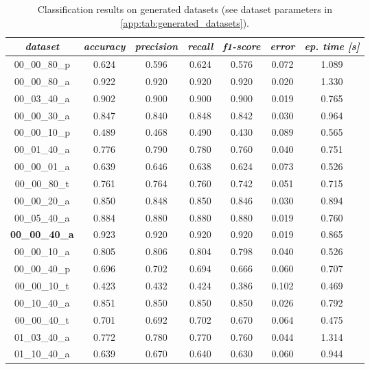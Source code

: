 \begin{table}[H]
\centering
\caption{Classification results on generated datasets (see dataset parameters in \cref{app:tab:generated_datasets}).}
\label{tab:classification_results}
\resizebox{\textwidth}{!} {
\begin{tabular}{|c|c|c|c|c|c|c|}
\hline
\textit{dataset} & \textit{accuracy} & \textit{precision} & \textit{recall} & \textit{f1-score} & \textit{error} & \textit{ep. time {[}s{]}} \\
\hline
00\_00\_80\_p 	& 0.624 	& 0.596 	& 0.624 	& 0.576 	& 0.072 	& 1.089 	 \\ \hline
00\_00\_80\_a 	& 0.922 	& 0.920 	& 0.920		& 0.920 	& 0.020 	& 1.330 	 \\ \hline
00\_03\_40\_a 	& 0.902 	& 0.900 	& 0.900 	& 0.900 	& 0.019 	& 0.765 	 \\ \hline
00\_00\_30\_a 	& 0.847 	& 0.840 	& 0.848 	& 0.842 	& 0.030 	& 0.964 	 \\ \hline
00\_00\_10\_p 	& 0.489 	& 0.468 	& 0.490 	& 0.430 	& 0.089 	& 0.565 	 \\ \hline
00\_01\_40\_a 	& 0.776 	& 0.790 	& 0.780 	& 0.760 	& 0.040 	& 0.751 	 \\ \hline
00\_00\_01\_a 	& 0.639 	& 0.646 	& 0.638 	& 0.624 	& 0.073 	& 0.526 	 \\ \hline
00\_00\_80\_t	& 0.761 	& 0.764 	& 0.760 	& 0.742 	& 0.051 	& 0.715 	 \\ \hline
00\_00\_20\_a 	& 0.850 	& 0.848 	& 0.850 	& 0.846 	& 0.030 	& 0.894 	 \\ \hline
00\_05\_40\_a 	& 0.884 	& 0.880 	& 0.880 	& 0.880 	& 0.019 	& 0.760 	 \\ \hline
\textbf{00\_00\_40\_a} 	& 0.923 	& 0.920 	& 0.920 	& 0.920 	& 0.019 	& 0.865 	 \\ \hline
00\_00\_10\_a 	& 0.805 	& 0.806 	& 0.804 	& 0.798 	& 0.040 	& 0.526 	 \\ \hline
00\_00\_40\_p 	& 0.696 	& 0.702 	& 0.694 	& 0.666 	& 0.060 	& 0.707 	 \\ \hline
00\_00\_10\_t 	& 0.423 	& 0.432 	& 0.424 	& 0.386 	& 0.102 	& 0.469 	 \\ \hline
00\_10\_40\_a 	& 0.851 	& 0.850 	& 0.850 	& 0.850 	& 0.026 	& 0.792 	 \\ \hline
00\_00\_40\_t	& 0.701 	& 0.692 	& 0.702 	& 0.670 	& 0.064 	& 0.475 	 \\ \hline
01\_03\_40\_a 	& 0.772 	& 0.780 	& 0.770 	& 0.760 	& 0.044 	& 1.314 	 \\ \hline
01\_10\_40\_a 	& 0.639 	& 0.670 	& 0.640 	& 0.630 	& 0.060 	& 0.944 	 \\ \hline

\end{tabular}}
\end{table}
